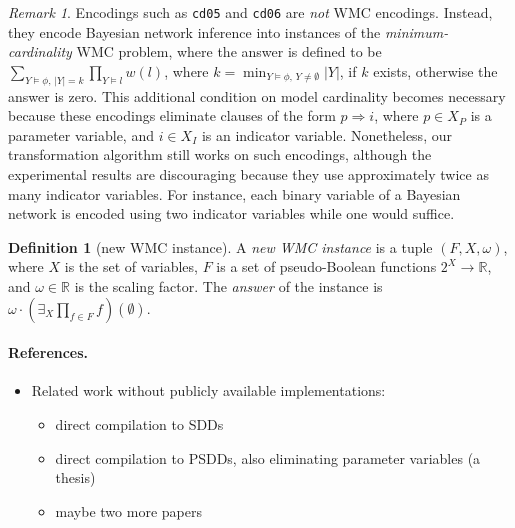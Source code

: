 \documentclass{article}
\theoremstyle{definition}
\newtheorem{definition}{Definition}
\theoremstyle{remark}
\newtheorem*{remark}{Remark}
\begin{document}
\begin{remark}
  Encodings such as \texttt{cd05} and \texttt{cd06} are \emph{not} WMC
  encodings. Instead, they encode Bayesian network inference into instances of
  the \emph{minimum-cardinality} WMC problem, where the answer is defined to be
  $\sum_{Y \models \phi\text{, }|Y| = k} \prod_{Y \models l}
  w(l)$, where $k = \min_{Y \models \phi\text{, }Y \ne \emptyset}
  |Y|$, if $k$ exists, otherwise the answer is zero. This additional
  condition on model cardinality becomes necessary because these encodings
  eliminate clauses of the form $p \Rightarrow i$, where $p \in X_P$ is a
  parameter variable, and $i \in X_I$ is an indicator variable. Nonetheless, our
  transformation algorithm still works on such encodings, although the
  experimental results are discouraging because they use approximately twice as
  many indicator variables. For instance, each binary variable of a Bayesian
  network is encoded using two indicator variables while one would suffice.
\end{remark} %

\begin{definition}[new WMC instance] \label{def:new_wmc}
  A \emph{new WMC instance} is a tuple $(F, X, \omega)$, where $X$ is the set of
  variables, $F$ is a set of pseudo-Boolean functions $2^X \to \mathbb{R}$, and
  $\omega \in \mathbb{R}$ is the scaling factor. The \emph{answer} of the
  instance is $\omega \cdot \left(\exists_X\prod_{f \in F}f\right)(\emptyset)$.
\end{definition}

\paragraph{References.}
\begin{itemize}
\item Related work without publicly available implementations:
  \begin{itemize}
  \item direct compilation to SDDs \cite{DBLP:conf/ecsqaru/ChoiKD13}
  \item direct compilation to PSDDs, also eliminating parameter variables (a thesis)
  \item maybe two more papers
  \end{itemize}
\end{itemize}
\end{document}
